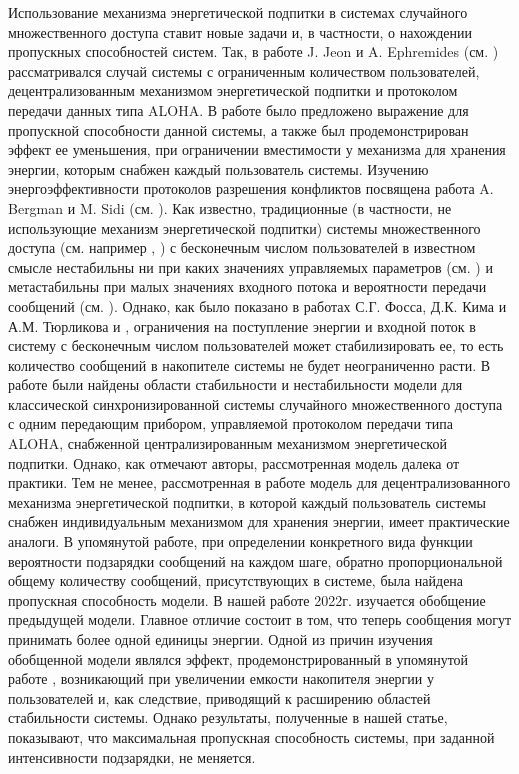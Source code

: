 \documentclass[10pt, reqno]{amsart}
\begin{document}
Использование механизма энергетической подпитки в системах случайного множественного доступа ставит новые задачи и, в частности, о нахождении пропускных способностей систем. Так, в работе J. Jeon и A. Ephremides (см. \cite{Jeon_finite_users}) рассматривался случай системы с ограниченным количеством пользователей, децентрализованным механизмом энергетической подпитки и протоколом передачи данных типа ALOHA. В работе было предложено выражение для пропускной способности данной системы, а также был продемонстрирован эффект ее уменьшения, при ограничении вместимости у механизма для хранения энергии, которым снабжен каждый пользователь системы. Изучению энергоэффективности протоколов разрешения конфликтов посвящена работа A. Bergman и M. Sidi (см. \cite{Efficiency_protocols}). Как известно, традиционные (в частности, не использующие механизм энергетической подпитки) системы множественного доступа (см. например \cite{Abramson_dev_of_aloha_net}, \cite{FGL_1977}) с бесконечным числом пользователей в известном смысле нестабильны ни при каких значениях управляемых параметров (см. \cite{Kelly_classical_aloha_instability}) и метастабильны при малых значениях входного потока и вероятности передачи сообщений (см. \cite{Vvedenskaya_metastability}). Однако, как было показано в работах С.Г. Фосса, Д.К. Кима и А.М. Тюрликова \cite{Foss_2014} и \cite{Foss_original}, ограничения на поступление энергии и входной поток в систему с бесконечным числом пользователей может стабилизировать ее, то есть количество сообщений в накопителе системы не будет неограниченно расти. В работе \cite{Foss_2014} были найдены области стабильности и нестабильности модели для классической синхронизированной системы случайного множественного доступа с одним передающим прибором, управляемой протоколом передачи типа ALOHA, снабженной централизированным механизмом энергетической подпитки. Однако, как отмечают авторы, рассмотренная модель далека от практики. Тем не менее, рассмотренная в работе \cite{Foss_original} модель для децентрализованного механизма энергетической подпитки, в которой каждый пользователь системы снабжен индивидуальным механизмом для хранения энергии, имеет практические аналоги. В упомянутой работе, при определении конкретного вида функции вероятности подзарядки сообщений на каждом шаге, обратно пропорциональной общему количеству сообщений, присутствующих в системе, была найдена пропускная способность модели. В нашей работе 2022г. \cite{Rezler_Chebunin} изучается обобщение предыдущей модели. Главное отличие состоит в том, что теперь сообщения могут принимать более одной единицы энергии. Одной из причин изучения обобщенной модели являлся эффект, продемонстрированный в упомянутой работе \cite{Jeon_finite_users}, возникающий при увеличении емкости накопителя энергии у пользователей и, как следствие, приводящий к расширению областей стабильности системы. Однако результаты, полученные в нашей статье, показывают, что максимальная пропускная способность системы, при заданной интенсивности подзарядки, не меняется. 
\end{document}
